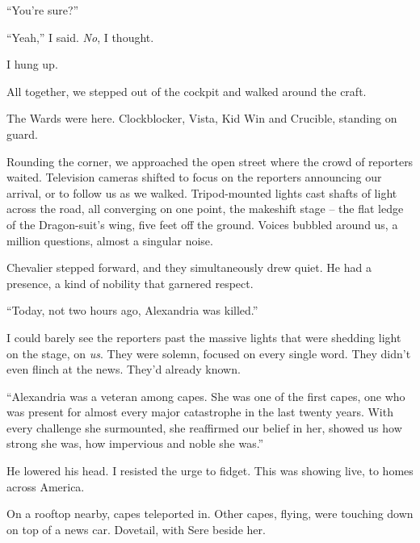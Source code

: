 ``You're sure?''



``Yeah,'' I said.  \emph{No}, I thought.



I hung up.



All together, we stepped out of the cockpit and walked around the craft.



The Wards were here.  Clockblocker, Vista, Kid Win and Crucible, standing on guard.



Rounding the corner, we approached the open street where the crowd of reporters waited.  Television cameras shifted to focus on the reporters announcing our arrival, or to follow us as we walked.  Tripod-mounted lights cast shafts of light across the road, all converging on one point, the makeshift stage – the flat ledge of the Dragon-suit's wing, five feet off the ground.  Voices bubbled around us, a million questions, almost a singular noise.



Chevalier stepped forward, and they simultaneously drew quiet.  He had a presence, a kind of nobility that garnered respect.



``Today, not two hours ago, Alexandria was killed.''



I could barely see the reporters past the massive lights that were shedding light on the stage, on \emph{us}.  They were solemn, focused on every single word.  They didn't even flinch at the news.  They'd already known.



``Alexandria was a veteran among capes.  She was one of the first capes, one who was present for almost every major catastrophe in the last twenty years.  With every challenge she surmounted, she reaffirmed our belief in her, showed us how strong she was, how impervious and noble she was.''



He lowered his head.  I resisted the urge to fidget.  This was showing live, to homes across America.



On a rooftop nearby, capes teleported in.  Other capes, flying, were touching down on top of a news car.  Dovetail, with Sere beside her.



